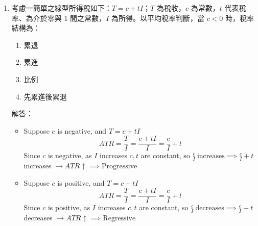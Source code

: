 \documentclass[12pt, a4paper]{article}
\begin{document}
\begin{enumerate}
    \item 考慮一簡單之線型所得稅如下：\(T = c + tI\)；\(T\) 為稅收，\(c\) 為常數，\(t\) 代表稅率、為介於零與 1 間之常數，\(I\) 為所得。以平均稅率判斷，當 \(c < 0\) 時，稅率結構為：
    \begin{enumerate}[label=\Alph*.]
        \item 累退
        \item 累進
        \item 比例
        \item 先累進後累退
    \end{enumerate}
    解答：
    \begin{itemize}
        \item Suppose $c$ is negative, and $T = c+tI$
        \[
        ATR = \frac{T}{I} = \frac{c + tI}{I} = \frac{c}{I} + t
        \]
        Since $c$ is negative, as $I$ increases $c,t$ are constant, so $\frac{c}{I}\ \text{increases} \implies \frac{c}{I} + t$ increases $\rightarrow ATR \uparrow \implies \text{Progressive}$
        \item Suppose $c$ is positive, and $T = c+tI$
        \[
        ATR = \frac{T}{I} = \frac{c + tI}{I} = \frac{c}{I} + t
        \]
        Since $c$ is positive, as $I$ increases $c,t$ are constant, so $\frac{c}{I}\ \text{decreases} \implies \frac{c}{I} + t$ decreases $\rightarrow ATR \uparrow \implies \text{Regressive}$
    \end{itemize}


\end{enumerate}
\end{document}
